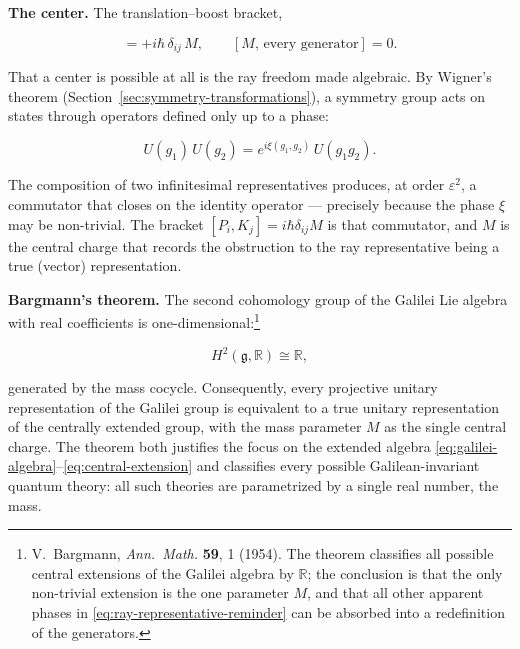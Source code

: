 \medskip\noindent\textbf{The center.} The translation--boost bracket,
\begin{linenomath}
\begin{equation}
[P_i,K_j] = +i\hbar\,\delta_{ij}\,M,
\qquad
[M,\,\text{every generator}] = 0.
\label{eq:central-extension}
\end{equation}
\end{linenomath}
That a center is possible at all is the ray freedom made algebraic. By Wigner's theorem (Section~\ref{sec:symmetry-transformations}), a symmetry group acts on states through operators defined only up to a phase:
\begin{linenomath}
\begin{equation}
U(g_{1})\,U(g_{2}) = e^{i\xi(g_{1},g_{2})}\,U(g_{1}g_{2}).
\label{eq:ray-representative-reminder}
\end{equation}
\end{linenomath}
The composition of two infinitesimal representatives produces, at order $\varepsilon^{2}$, a commutator that closes on the identity operator --- precisely because the phase $\xi$ may be non-trivial. The bracket $[P_i,K_j] = i\hbar\delta_{ij}M$ is that commutator, and $M$ is the central charge that records the obstruction to the ray representative being a true (vector) representation.

\medskip\noindent\textbf{Bargmann's theorem.} The second cohomology group of the Galilei Lie algebra with real coefficients is one-dimensional:\footnote{V.~Bargmann, \emph{Ann.~Math.} \textbf{59}, 1 (1954). The theorem classifies all possible central extensions of the Galilei algebra by $\mathbb{R}$; the conclusion is that the only non-trivial extension is the one parameter $M$, and that all other apparent phases in \eqref{eq:ray-representative-reminder} can be absorbed into a redefinition of the generators.}
\begin{linenomath}
\begin{equation}
H^{2}(\mathfrak{g},\mathbb{R}) \cong \mathbb{R},
\end{equation}
\end{linenomath}
generated by the mass cocycle. Consequently, every projective unitary representation of the Galilei group is equivalent to a true unitary representation of the centrally extended group, with the mass parameter $M$ as the single central charge. The theorem both justifies the focus on the extended algebra \eqref{eq:galilei-algebra}--\eqref{eq:central-extension} and classifies every possible Galilean-invariant quantum theory: all such theories are parametrized by a single real number, the mass.

